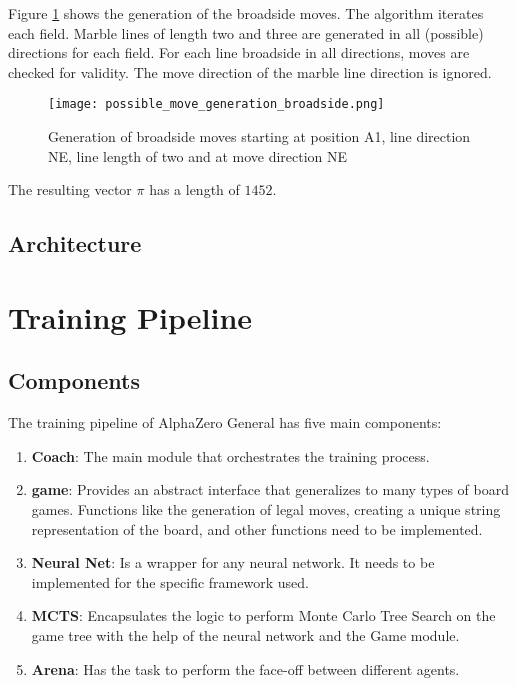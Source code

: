 \begin{enumerate}
          Figure \ref{possible_move_generation_broadside} shows the generation of the broadside moves. The algorithm iterates each field. Marble lines of length two and three are generated in all (possible) directions for each field. For each line broadside in all directions, moves are checked for validity. The move direction of the marble line direction is ignored.

          \begin{figure}
              \centering
              \texttt{[image: possible\_move\_generation\_broadside.png]}
              \caption{Generation of broadside moves starting at position A1, line direction NE, line length of two and at move direction NE}
              \label{possible_move_generation_broadside}
          \end{figure}

          The resulting vector $\pi$ has a length of $1452$.
\end{enumerate}

\subsection{Architecture}
\section{Training Pipeline}
\subsection{Components}
\label{components}

The training pipeline of AlphaZero General has five main components:
\begin{enumerate}
    \item \textbf{Coach}: The main module that orchestrates the training process.
    \item \textbf{game}: Provides an abstract interface that generalizes to many types of board games. Functions like the generation of legal moves, creating a unique string representation of the board, and other functions need to be implemented.
    \item \textbf{Neural Net}: Is a wrapper for any neural network. It needs to be implemented for the specific framework used.
    \item \textbf{MCTS}: Encapsulates the logic to perform Monte Carlo Tree Search on the game tree with the help of the neural network and the Game module.
    \item \textbf{Arena}: Has the task to perform the face-off between different agents.
\end{enumerate}

